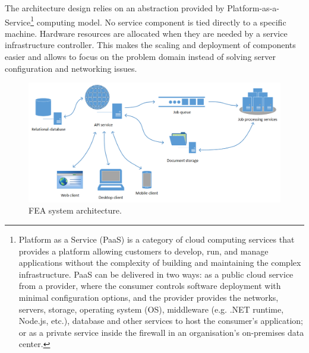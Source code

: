 The architecture design relies on an abstraction provided by Platform-as-a-Service\footnote{Platform as a Service (PaaS) is a category of cloud computing services that provides a platform allowing customers to develop, run, and manage applications without the complexity of building and maintaining the complex infrastructure. PaaS can be delivered in two ways: as a public cloud service from a provider, where the consumer controls software deployment with minimal configuration options, and the provider provides the networks, servers, storage, operating system (OS), middleware (e.g. .NET runtime, Node.js, etc.), database and other services to host the consumer's application; or as a private service inside the firewall in an organisation's on-premises data center.} computing model. No service component is tied directly to a specific machine. Hardware resources are allocated when they are needed by a service infrastructure controller. This makes the scaling and deployment of components easier and allows to focus on the problem domain instead of solving server configuration and networking issues.

\begin{figure}[H]
    \centering
    \includegraphics[width=\textwidth]{figures/chapter-data-management/FEA-architecture}
    \decoRule
    \caption{FEA system architecture.}
    \label{fig:FEA-architecture}
\end{figure}

